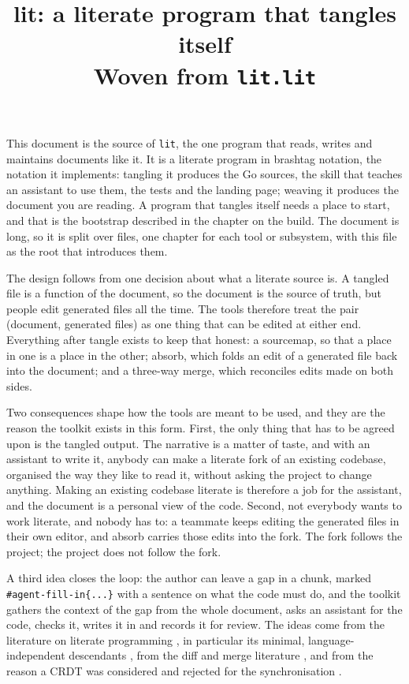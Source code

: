 \documentclass[10pt,a4paper]{article}
\title{lit: a literate program that tangles itself\\[0.4em]\large Woven from \texttt{lit.\allowbreak{}lit}}
\author{}
\date{}
\newcounter{chunk}
\begin{document}
\maketitle
\tableofcontents
This document is the source of \texttt{lit}, the one program that reads, writes and maintains documents like it. It is a literate program in brashtag notation, the notation it implements: tangling it produces the Go sources, the skill that teaches an assistant to use them, the tests and the landing page; weaving it produces the document you are reading. A program that tangles itself needs a place to start, and that is the bootstrap described in the chapter on the build. The document is long, so it is split over files, one chapter for each tool or subsystem, with this file as the root that introduces them.

The design follows from one decision about what a literate source is. A tangled file is a function of the document, so the document is the source of truth, but people edit generated files all the time. The tools therefore treat the pair (document, generated files) as one thing that can be edited at either end. Everything after tangle exists to keep that honest: a sourcemap, so that a place in one is a place in the other; absorb, which folds an edit of a generated file back into the document; and a three-way merge, which reconciles edits made on both sides.

Two consequences shape how the tools are meant to be used, and they are the reason the toolkit exists in this form. First, the only thing that has to be agreed upon is the tangled output. The narrative is a matter of taste, and with an assistant to write it, anybody can make a literate fork of an existing codebase, organised the way they like to read it, without asking the project to change anything. Making an existing codebase literate is therefore a job for the assistant, and the document is a personal view of the code. Second, not everybody wants to work literate, and nobody has to: a teammate keeps editing the generated files in their own editor, and absorb carries those edits into the fork. The fork follows the project; the project does not follow the fork.

A third idea closes the loop: the author can leave a gap in a chunk, marked \texttt{\#agent-fill-in\{.\allowbreak{}.\allowbreak{}.\allowbreak{}\}} with a sentence on what the code must do, and the toolkit gathers the context of the gap from the whole document, asks an assistant for the code, checks it, writes it in and records it for review. The ideas come from the literature on literate programming \cite{knuth1984lp}, in particular its minimal, language-independent descendants \cite{ramsey1994lp}, from the diff and merge literature \cite{myers1986diff,khanna2007diff3}, and from the reason a CRDT was considered and rejected for the synchronisation \cite{shapiro2011crdt}.
\end{document}
